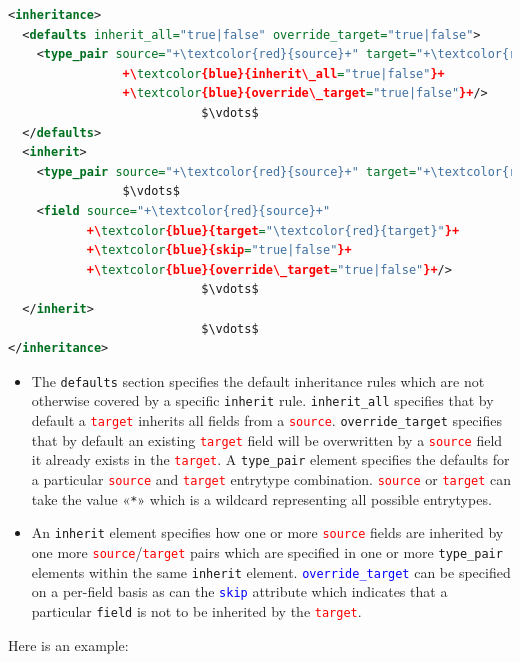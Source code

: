 \documentclass{ltxdockit}
\begin{document}
\begin{lstlisting}[language=xml,escapechar=+,mathescape=true]
<inheritance>
  <defaults inherit_all="true|false" override_target="true|false">
    <type_pair source="+\textcolor{red}{source}+" target="+\textcolor{red}{target}+"
                +\textcolor{blue}{inherit\_all="true|false"}+
                +\textcolor{blue}{override\_target="true|false"}+/>
                           $\vdots$
  </defaults>
  <inherit>
    <type_pair source="+\textcolor{red}{source}+" target="+\textcolor{red}{target}+"/>
                $\vdots$
    <field source="+\textcolor{red}{source}+"
           +\textcolor{blue}{target="\textcolor{red}{target}"}+
           +\textcolor{blue}{skip="true|false"}+
           +\textcolor{blue}{override\_target="true|false"}+/>
                           $\vdots$
  </inherit>
                           $\vdots$
</inheritance>
\end{lstlisting}

\begin{itemize}
\item The \texttt{defaults} section specifies the default inheritance rules
  which are not otherwise covered by a specific \texttt{inherit} rule.
  \texttt{inherit\_all} specifies that by default a
  \textcolor{red}{\texttt{target}} inherits all fields from a
  \textcolor{red}{\texttt{source}}. \texttt{override\_target} specifies
  that by default an existing \textcolor{red}{\texttt{target}} field will
  be overwritten by a \textcolor{red}{\texttt{source}} field it already
  exists in the \textcolor{red}{\texttt{target}}. A \texttt{type\_pair}
  element specifies the defaults for a particular
  \textcolor{red}{\texttt{source}} and \textcolor{red}{\texttt{target}}
  entrytype combination. \textcolor{red}{\texttt{source}} or
  \textcolor{red}{\texttt{target}} can take the value «\texttt{*}» which
  is a wildcard representing all possible entrytypes.
\item An \texttt{inherit} element specifies how one or more
  \textcolor{red}{\texttt{source}} fields are inherited by one more
  \textcolor{red}{\texttt{source}}/\textcolor{red}{\texttt{target}}
  pairs which are specified in one or more \texttt{type\_pair} elements
  within the same \texttt{inherit} element.
  \textcolor{blue}{\texttt{override\_target}} can be specified on a
  per-field basis as can the \textcolor{blue}{\texttt{skip}} attribute
  which indicates that a particular \texttt{field} is not to be inherited by
  the \textcolor{red}{\texttt{target}}.
\end{itemize}
%
Here is an example:
\end{document}
